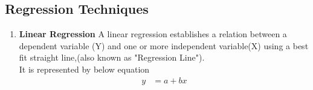 \documentclass[fleqn,10pt]{SelfArx} %
\begin{document}
\subsection{Regression Techniques}
\begin{enumerate}
\item \textbf{Linear Regression}
\newline A linear regression establishes a relation between a dependent variable (Y) and one or more independent variable(X) using a best fit straight line,(also known as "Regression Line").
\\ It is represented by below equation 
\begin{subequations}
\begin{align}
y & = a+bx 
\end{align}



\end{subequations}
\end{enumerate}
\end{document}
